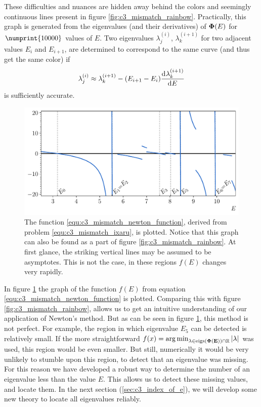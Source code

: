 These difficulties and nuances are hidden away behind the colors and seemingly continuous lines present in figure \ref{fig:c3_mismatch_rainbow}. Practically, this graph is generated from the eigenvalues (and their derivatives) of $\vb{\Phi}(E)$ for $\numprint{10000}$ values of $E$. Two eigenvalues $\lambda^{(i)}_j$, $\lambda^{(i+1)}_k$  for two adjacent values $E_{i}$ and $E_{i+1}$, are determined to correspond to the same curve (and thus get the same color) if
$$ \lambda^{(i)}_j \approx \lambda^{(i+1)}_k - (E_{i+1} - E_i) \dv[]{\lambda^{(i+1)}_k}{E} $$
is sufficiently accurate.

\begin{figure}
    \centering
    \includegraphics[width=\textwidth]{img/chapter3/mismatch_newton.pdf}
    \caption{The function \eqref{equ:c3_mismatch_newton_function}, derived from problem \eqref{equ:c3_mismatch_ixaru}, is plotted. Notice that this graph can also be found as a part of figure \ref{fig:c3_mismatch_rainbow}. At first glance, the striking vertical lines may be assumed to be asymptotes. This is not the case, in these regions $f(E)$ changes very rapidly.}\label{fig:c3_mismatch_newton}
\end{figure}

In figure \ref{fig:c3_mismatch_newton} the graph of the function $f(E)$ from equation \eqref{equ:c3_mismatch_newton_function} is plotted. Comparing this with figure \ref{fig:c3_mismatch_rainbow}, allows us to get an intuitive understanding of our application of Newton's method. But as can be seen in figure \ref{fig:c3_mismatch_newton}, this method is not perfect. For example, the region in which eigenvalue $E_5$ can be detected is relatively small. If the more straightforward $f(x) = \operatorname*{arg\,min}_{\lambda \in \operatorname{eigs}(\vb{\Phi(E)}) \cap \mathbb{R}} \left|\lambda\right|$ was used, this region would be even smaller. But still, numerically it would be very unlikely to stumble upon this region, to detect that an eigenvalue was missing. For this reason we have developed a robust way to determine the number of an eigenvalue less than the value $E$. This allows us to detect these missing values, and locate them. In the next section (\ref{sec:c3_index_of_e}), we will develop some new theory to locate all eigenvalues reliably.

